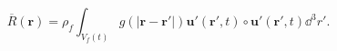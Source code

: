 \begin{equation}
\overline{R}(\mathbf{r}) = 
\rho_f 
\int_{V_f(t)}{g(|\mathbf{r} - \mathbf{r'}|)  
\mathbf{u'}(\mathbf{r'}, t) \circ \mathbf{u'}(\mathbf{r'}, t)
\dd^3 r'} .
 \label{eq:rr}
\end{equation}
